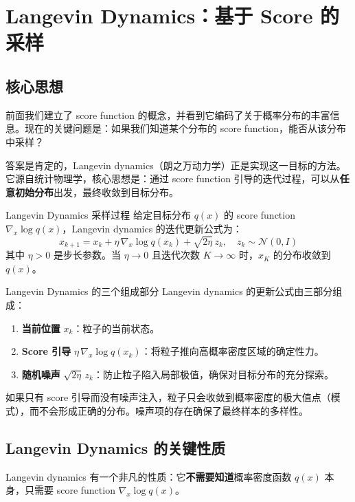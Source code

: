 \section{Langevin Dynamics：基于 Score 的采样}

\subsection{核心思想}

前面我们建立了 score function 的概念，并看到它编码了关于概率分布的丰富信息。现在的关键问题是：如果我们知道某个分布的 score function，能否从该分布中采样？

答案是肯定的，Langevin dynamics（朗之万动力学）正是实现这一目标的方法。它源自统计物理学，核心思想是：通过 score function 引导的迭代过程，可以从\textbf{任意初始分布}出发，最终收敛到目标分布。

\begin{importantbox}{Langevin Dynamics 采样过程}
给定目标分布 $q(x)$ 的 score function $\nabla_x \log q(x)$，Langevin dynamics 的迭代更新公式为：
$$x_{k+1} = x_k + \eta\, \nabla_x \log q(x_k) + \sqrt{2\eta}\, z_k, \quad z_k \sim \mathcal{N}(0, I)$$
其中 $\eta > 0$ 是步长参数。当 $\eta \to 0$ 且迭代次数 $K \to \infty$ 时，$x_K$ 的分布收敛到 $q(x)$。
\end{importantbox}

\begin{knowledgebox}{Langevin Dynamics 的三个组成部分}
Langevin dynamics 的更新公式由三部分组成：
\begin{enumerate}
    \item \textbf{当前位置} $x_k$：粒子的当前状态。
    \item \textbf{Score 引导} $\eta\, \nabla_x \log q(x_k)$：将粒子推向高概率密度区域的确定性力。
    \item \textbf{随机噪声} $\sqrt{2\eta}\, z_k$：防止粒子陷入局部极值，确保对目标分布的充分探索。
\end{enumerate}
如果只有 score 引导而没有噪声注入，粒子只会收敛到概率密度的极大值点（模式），而不会形成正确的分布。噪声项的存在确保了最终样本的多样性。
\end{knowledgebox}

\subsection{Langevin Dynamics 的关键性质}

Langevin dynamics 有一个非凡的性质：它\textbf{不需要知道}概率密度函数 $q(x)$ 本身，只需要 score function $\nabla_x \log q(x)$。

